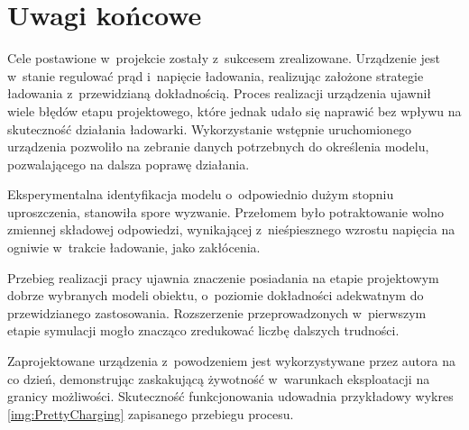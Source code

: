 \documentclass[polish,engineer]{polsl-msth}
\begin{document}
\chapter{Uwagi końcowe}
Cele postawione w~projekcie zostały z~sukcesem zrealizowane. Urządzenie jest w~stanie regulować prąd i~napięcie ładowania, realizując założone strategie ładowania z~przewidzianą dokładnością. Proces realizacji urządzenia ujawnił wiele błędów etapu projektowego, które jednak udało się naprawić bez wpływu na skuteczność działania ładowarki. Wykorzystanie wstępnie uruchomionego urządzenia pozwoliło na zebranie danych potrzebnych do określenia modelu, pozwalającego na dalsza poprawę działania. 

Eksperymentalna identyfikacja modelu o~odpowiednio dużym stopniu uproszczenia, stanowiła spore wyzwanie. Przełomem było potraktowanie wolno zmiennej składowej odpowiedzi, wynikającej z~nieśpiesznego wzrostu napięcia na ogniwie w~trakcie ładowanie, jako zakłócenia.

Przebieg realizacji pracy ujawnia znaczenie posiadania na etapie projektowym dobrze wybranych modeli obiektu, o~poziomie dokładności adekwatnym do przewidzianego zastosowania. Rozszerzenie przeprowadzonych w~pierwszym etapie symulacji mogło znacząco zredukować liczbę dalszych trudności.

Zaprojektowane urządzenia z~powodzeniem jest wykorzystywane przez autora na co dzień, demonstrując zaskakującą żywotność w~warunkach eksploatacji na granicy możliwości.
Skuteczność funkcjonowania udowadnia przykładowy wykres \ref{img:PrettyCharging} zapisanego przebiegu procesu.

 

\end{document}
